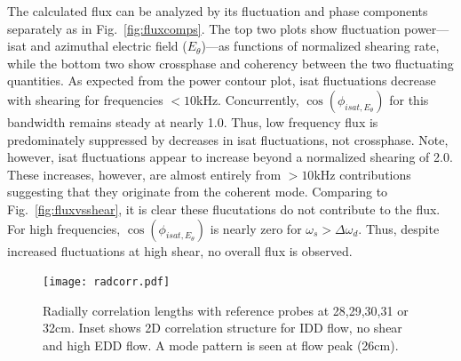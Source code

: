 \documentclass[%
 aps,
 prl,
 amsmath,amssymb,
 reprint,%
]{revtex4-1}
\begin{document}
The calculated flux can be analyzed by its fluctuation and phase components separately as in Fig.~\ref{fig:fluxcomps}. The top two plots show fluctuation power---isat and azimuthal electric field ($E_{\theta}$)---as functions of normalized shearing rate, while the bottom two show crossphase and coherency between the two fluctuating quantities. As expected from the power contour plot, isat fluctuations decrease with shearing for frequencies $<10$kHz. Concurrently, $\cos(\phi_{isat,E_{\theta}})$ for this bandwidth remains steady at nearly 1.0. Thus, low frequency flux is predominately suppressed by decreases in isat fluctuations, not crossphase. Note, however, isat fluctuations appear to increase beyond a normalized shearing of 2.0. These increases, however, are almost entirely from $>10$kHz contributions suggesting that they originate from the coherent mode. Comparing to Fig.~\ref{fig:fluxvsshear}, it is clear these flucutations do not contribute to the flux. For high frequencies, $\cos(\phi_{isat,E_{\theta}})$ is nearly zero for $\omega_{s} > \Delta \omega_{d}$. Thus, despite increased fluctuations at high shear, no overall flux is observed. 


\begin{figure}
\begin{center}
\texttt{[image: radcorr.pdf]}%
\caption{\label{fig:radcorr} Radially correlation lengths with reference probes at 28,29,30,31 or 32cm. Inset shows 2D correlation structure for IDD flow, no shear and high EDD flow. A mode pattern is seen at flow peak (26cm).}
\end{center}
\end{figure}
\end{document}
